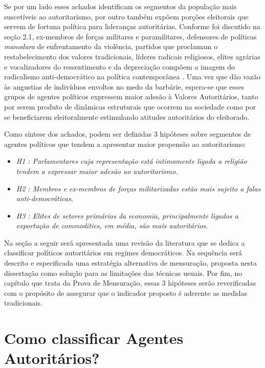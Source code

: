 \documentclass[
12pt,				%
openright,			%
twoside,			%
a4paper,			%
english,			%
french,				%
spanish,			%
brazil				%
]{abntex2}
\begin{document}
Se por um lado esses achados identificam os segmentos da população mais suscetíveis ao autoritarismo, por outro também expõem porções eleitorais que servem de fortuna política para lideranças autoritárias. Conforme foi discutido na seção 2.1, ex-membros de forças militares e paramilitares, defensores de políticas \emph{manodura} de enfrentamento da violência, partidos que proclamam o restabelecimento dos valores tradicionais, líderes radicais religiosos, elites agrárias e vocalizadores do ressentimento e da depreciação compõem a imagem do radicalismo anti-democrático na política contemporânea \cite{valenzuela2004latin,norris2005radical,mudde2009populist,loxton2014authoritarian,loxton2015authoritarian}. Uma vez que dão vazão às angustias de indivíduos envoltos no medo da barbárie, espera-se que esses grupos de agentes políticos  expressem maior adesão à Valores Autoritários, tanto por serem produto de dinâmicas estruturais que ocorrem na sociedade como por se beneficiarem eleitoralmente estimulando atitudes autoritários do eleitorado. 
  
Como síntese dos achados, podem ser definidas 3 hipóteses sobre segmentos de agentes políticos que tendem a apresentar maior propensão ao autoritarismo:

\begin{itemize}
	\item \textit{H1 : Parlamentares cuja representação está intimamente ligada a religião tendem a expressar maior adesão ao autoritarismo.}
	\item \textit{H2 : Membros e ex-membros de forças militarizadas estão mais sujeito a falas anti-democráticas.}
	\item \textit{H3 : Elites de setores primários da economia, principalmente ligados a exportação de \emph{commodities}, em média, são mais autoritários.}
\end{itemize} 

Na seção a seguir será apresentada uma revisão da literatura que se dedica a classificar políticos autoritários em regimes democráticos. Na sequência será descrito e especificada uma estratégia alternativa de mensuração, proposta nesta dissertação como solução para as limitações das técnicas usuais. Por fim, no capítulo que trata da Prova de Mensuração, essas 3 hipóteses serão reverificadas com o propósito de assegurar que o indicador proposto é aderente as medidas tradicionais. 


\chapter{Como classificar Agentes Autoritários?}\label{metodologia}
\end{document}
